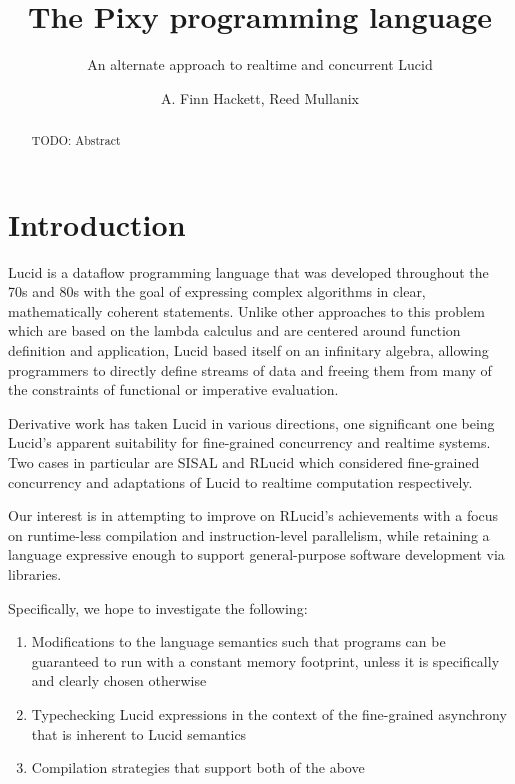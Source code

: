 \documentclass{scrartcl}
\begin{document}
    \title{The Pixy programming language}
    \subtitle{An alternate approach to realtime and concurrent Lucid}
    \author{A. Finn Hackett, Reed Mullanix}
    
    \maketitle
    
    \begin{abstract}
        TODO: Abstract
    \end{abstract}

    \tableofcontents

    \section{Introduction}
    
    Lucid is a dataflow programming language that was developed throughout the 70s and 80s with the goal of expressing complex algorithms in clear, mathematically coherent statements. Unlike other approaches to this problem which are based on the lambda calculus and are centered around function definition and application, Lucid based itself on an infinitary algebra, allowing programmers to directly define streams of data and freeing them from many of the constraints of functional or imperative evaluation.
    
    Derivative work has taken Lucid in various directions, one significant one being Lucid's apparent suitability for fine-grained concurrency and realtime systems. Two cases in particular are SISAL and RLucid which considered fine-grained concurrency and adaptations of Lucid to realtime computation respectively.
    
    Our interest is in attempting to improve on RLucid's achievements with a focus on runtime-less compilation and instruction-level parallelism, while retaining a language expressive enough to support general-purpose software development via libraries.
    
    Specifically, we hope to investigate the following:
    \begin{enumerate}
        \item Modifications to the language semantics such that programs can be guaranteed to run with a constant memory footprint, unless it is specifically and clearly chosen otherwise
        \item Typechecking Lucid expressions in the context of the fine-grained asynchrony that is inherent to Lucid semantics
        \item Compilation strategies that support both of the above
    \end{enumerate}
    
\end{document}
